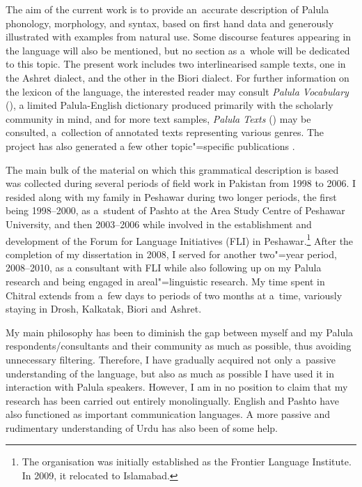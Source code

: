 The aim of the current work is to provide an~accurate description of Palula phonology, morphology,
and syntax, based on first hand data and generously illustrated with examples from natural use. Some
discourse features appearing in the language will also be mentioned, but no section as a~whole will
be dedicated to this topic. The present work includes two interlinearised sample texts, one in the Ashret dialect, and the other in the Biori dialect. For further information on the lexicon of the language, the interested reader may consult \textit{Palula Vocabulary} (\citealt{liljegrenhaider2011}), a limited Palula-English dictionary produced primarily with the scholarly community in mind, and for more text samples, \textit{Palula Texts} (\citealt{liljegrenhaider2015}) may be consulted, a~collection of annotated texts representing various genres. The project has also generated a few other topic"=specific publications \citep{liljegren2009,liljegrenhaider2009,liljegren2010,liljegrenhaider2015b}. 


The main bulk of the material on which this grammatical description is based was collected during
several periods of field work in Pakistan from 1998 to 2006. I resided along with my family in
Peshawar during two longer periods, the first being 1998--2000, as a~student of Pashto at the Area
Study Centre of Peshawar University, and then 2003--2006 while involved in the establishment and
development of the Forum for Language Initiatives (FLI) in Peshawar.\footnote{The organisation was initially established as the Frontier Language Institute. In 2009, it relocated to Islamabad.} After the completion of my dissertation in 2008, I served for another two"=year period, 2008--2010, as a consultant with FLI while also following up on my Palula research and being engaged in areal"=linguistic research. My time spent in Chitral extends from
a~few days to periods of two months at a~time, variously staying in Drosh, Kalkatak, Biori and Ashret.


My main philosophy has been to diminish the gap between myself and my Palula respondents/consultants
and their community as much as possible, thus avoiding unnecessary filtering. Therefore, I have
gradually acquired not only a~passive understanding of the language, but also as much as possible I
have used it in interaction with Palula speakers. However, I am in no position to claim that my
research has been carried out entirely monolingually. English and Pashto have also functioned as important
communication languages. A more passive and rudimentary understanding of Urdu has also been of some
help.



